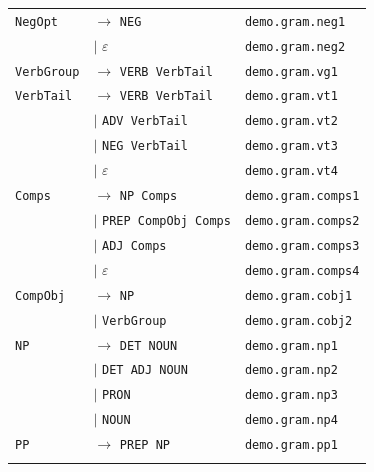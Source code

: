 \begin{longtable}{@{}l l l@{}}
\addlinespace
\texttt{NegOpt} & $\rightarrow$ \texttt{NEG} & \scriptsize\texttt{demo.gram.neg1} \\
\texttt{} & $\mid$ $\varepsilon$ & \scriptsize\texttt{demo.gram.neg2} \\
\addlinespace
\texttt{VerbGroup} & $\rightarrow$ \texttt{VERB VerbTail} & \scriptsize\texttt{demo.gram.vg1} \\
\addlinespace
\texttt{VerbTail} & $\rightarrow$ \texttt{VERB VerbTail} & \scriptsize\texttt{demo.gram.vt1} \\
\texttt{} & $\mid$ \texttt{ADV VerbTail} & \scriptsize\texttt{demo.gram.vt2} \\
\texttt{} & $\mid$ \texttt{NEG VerbTail} & \scriptsize\texttt{demo.gram.vt3} \\
\texttt{} & $\mid$ $\varepsilon$ & \scriptsize\texttt{demo.gram.vt4} \\
\addlinespace
\texttt{Comps} & $\rightarrow$ \texttt{NP Comps} & \scriptsize\texttt{demo.gram.comps1} \\
\texttt{} & $\mid$ \texttt{PREP CompObj Comps} & \scriptsize\texttt{demo.gram.comps2} \\
\texttt{} & $\mid$ \texttt{ADJ Comps} & \scriptsize\texttt{demo.gram.comps3} \\
\texttt{} & $\mid$ $\varepsilon$ & \scriptsize\texttt{demo.gram.comps4} \\
\addlinespace
\texttt{CompObj} & $\rightarrow$ \texttt{NP} & \scriptsize\texttt{demo.gram.cobj1} \\
\texttt{} & $\mid$ \texttt{VerbGroup} & \scriptsize\texttt{demo.gram.cobj2} \\
\addlinespace
\texttt{NP} & $\rightarrow$ \texttt{DET NOUN} & \scriptsize\texttt{demo.gram.np1} \\
\texttt{} & $\mid$ \texttt{DET ADJ NOUN} & \scriptsize\texttt{demo.gram.np2} \\
\texttt{} & $\mid$ \texttt{PRON} & \scriptsize\texttt{demo.gram.np3} \\
\texttt{} & $\mid$ \texttt{NOUN} & \scriptsize\texttt{demo.gram.np4} \\
\addlinespace
\texttt{PP} & $\rightarrow$ \texttt{PREP NP} & \scriptsize\texttt{demo.gram.pp1} \\
\addlinespace
\end{longtable}
